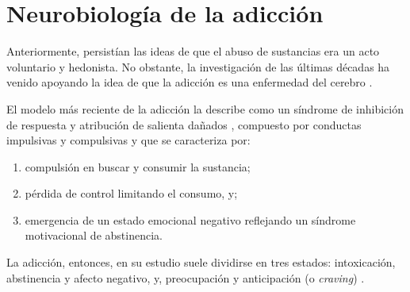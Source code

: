 \section{Neurobiología de la adicción}
Anteriormente, persistían las ideas de que el abuso de sustancias era un acto voluntario y hedonista.
No obstante, la investigación de las últimas décadas ha venido apoyando la idea de que la adicción es una enfermedad del cerebro \parencite{Volkow2016}.\par
El modelo más reciente de la adicción la describe como un síndrome de inhibición de respuesta y atribución de salienta dañados \parencite{Goldstein2012a}, compuesto por conductas impulsivas y compulsivas \parencite{Koob2010a} y que se caracteriza por:
\begin{enumerate}
    \item{compulsión en buscar y consumir la sustancia; }
    \item{pérdida de control limitando el consumo, y; }
    \item{emergencia de un estado emocional negativo reflejando un síndrome motivacional de abstinencia.}
\end{enumerate}
La adicción, entonces, en su estudio suele dividirse en tres estados: intoxicación, abstinencia y afecto negativo, y, preocupación y anticipación (o \textit{craving}) \parencite{Koob2010a,Goldstein2012a,Volkow2016}.

